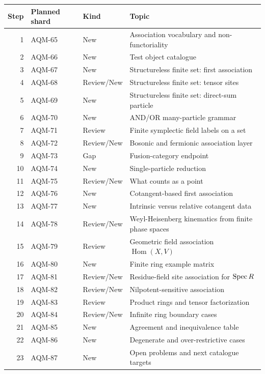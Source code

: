 \begin{center}
\begin{tabular}{rlll}
\toprule
Step & Planned shard & Kind & Topic \\
\midrule
1 & AQM-65 & New & Association vocabulary and non-functoriality \\
2 & AQM-66 & New & Test object catalogue \\
3 & AQM-67 & New & Structureless finite set: first association \\
4 & AQM-68 & Review/New & Structureless finite set: tensor sites \\
5 & AQM-69 & New & Structureless finite set: direct-sum particle \\
6 & AQM-70 & New & AND/OR many-particle grammar \\
7 & AQM-71 & Review & Finite symplectic field labels on a set \\
8 & AQM-72 & Review/New & Bosonic and fermionic association layer \\
9 & AQM-73 & Gap & Fusion-category endpoint \\
10 & AQM-74 & New & Single-particle reduction \\
11 & AQM-75 & Review/New & What counts as a point \\
12 & AQM-76 & New & Cotangent-based first association \\
13 & AQM-77 & New & Intrinsic versus relative cotangent data \\
14 & AQM-78 & Review/New & Weyl-Heisenberg kinematics from finite phase spaces \\
15 & AQM-79 & Review & Geometric field association \(\operatorname{Hom}(X,V)\) \\
16 & AQM-80 & New & Finite ring example matrix \\
17 & AQM-81 & Review/New & Residue-field site association for \(\operatorname{Spec} R\) \\
18 & AQM-82 & Review/New & Nilpotent-sensitive association \\
19 & AQM-83 & Review & Product rings and tensor factorization \\
20 & AQM-84 & Review/New & Infinite ring boundary cases \\
21 & AQM-85 & New & Agreement and inequivalence table \\
22 & AQM-86 & New & Degenerate and over-restrictive cases \\
23 & AQM-87 & New & Open problems and next catalogue targets \\
\bottomrule
\end{tabular}
\end{center}

